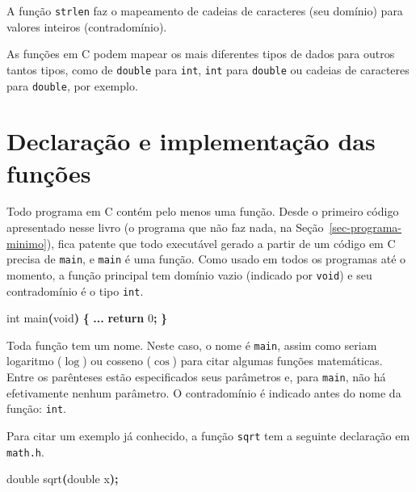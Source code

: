 \documentclass[
  11pt,
  a4paper,
]{scrbook}
\newenvironment{Shaded}{\begin{snugshade}}{\end{snugshade}}
\newcommand{\ControlFlowTok}[1]{\textcolor[rgb]{0.13,0.29,0.53}{\textbf{#1}}}
\newcommand{\DataTypeTok}[1]{\textcolor[rgb]{0.13,0.29,0.53}{#1}}
\newcommand{\DecValTok}[1]{\textcolor[rgb]{0.00,0.00,0.81}{#1}}
\newcommand{\NormalTok}[1]{#1}
\newcommand{\OperatorTok}[1]{\textcolor[rgb]{0.81,0.36,0.00}{\textbf{#1}}}
\begin{document}
A função \texttt{strlen} faz o mapeamento de cadeias de caracteres (seu
domínio) para valores inteiros (contradomínio).

As funções em C podem mapear os mais diferentes tipos de dados para
outros tantos tipos, como de \texttt{double} para \texttt{int},
\texttt{int} para \texttt{double} ou cadeias de caracteres para
\texttt{double}, por exemplo.

\section{Declaração e implementação das
funções}\label{declarauxe7uxe3o-e-implementauxe7uxe3o-das-funuxe7uxf5es}

Todo programa em C contém pelo menos uma função. Desde o primeiro código
apresentado nesse livro (o programa que não faz nada, na
Seção~\ref{sec-programa-minimo}), fica patente que todo executável
gerado a partir de um código em C precisa de \texttt{main}, e
\texttt{main} é uma função. Como usado em todos os programas até o
momento, a função principal tem domínio vazio (indicado por
\texttt{void}) e seu contradomínio é o tipo \texttt{int}.

\begin{Shaded}
\begin{Highlighting}[]
\DataTypeTok{int}\NormalTok{ main}\OperatorTok{(}\DataTypeTok{void}\OperatorTok{)} \OperatorTok{\{}
    \OperatorTok{...}
    \ControlFlowTok{return} \DecValTok{0}\OperatorTok{;}
\OperatorTok{\}}
\end{Highlighting}
\end{Shaded}

Toda função tem um nome. Neste caso, o nome é \texttt{main}, assim como
seriam logaritmo (\(\log\)) ou cosseno (\(\cos\)) para citar algumas
funções matemáticas. Entre os parênteses estão especificados seus
parâmetros e, para \texttt{main}, não há efetivamente nenhum parâmetro.
O contradomínio é indicado antes do nome da função: \texttt{int}.

Para citar um exemplo já conhecido, a função \texttt{sqrt} tem a
seguinte declaração em \texttt{math.h}.

\begin{Shaded}
\begin{Highlighting}[]
\DataTypeTok{double}\NormalTok{ sqrt}\OperatorTok{(}\DataTypeTok{double}\NormalTok{ x}\OperatorTok{);}
\end{Highlighting}
\end{Shaded}
\end{document}
